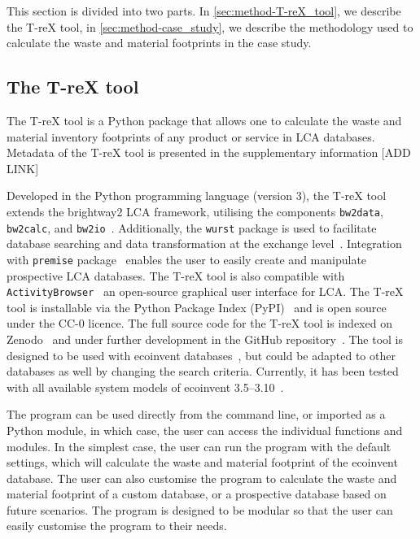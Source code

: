 This section is divided into two parts. In \autoref{sec:method-T-reX_tool}, we describe the T-reX tool, in \autoref{sec:method-case_study}, we describe the methodology used to calculate the waste and material footprints in the case study.

\subsection{The T-reX tool}
\label{sec:method-T-reX_tool}

The T-reX tool is a Python package that allows one to calculate the waste and material inventory footprints of any product or service in LCA databases. Metadata of the T-reX tool is presented in the supplementary information [ADD LINK]
    
Developed in the Python programming language (version 3), the T-reX tool extends the brightway2 LCA framework, utilising the components \texttt{bw2data}, \texttt{bw2calc}, and \texttt{bw2io}~\citep{mutel2017brightway}. Additionally, the \texttt{wurst} package is used to facilitate database searching and data transformation at the exchange level~\citep{mutel2017wurst}. Integration with \texttt{premise} package~\citep{sacchi2022premise} enables the user to easily create and manipulate prospective LCA databases. The T-reX tool is also compatible with \texttt{ActivityBrowser}~\citep{steubing2020activitybrowser} an open-source graphical user interface for LCA. The T-reX tool is installable via the Python Package Index (PyPI)~\citep{mcdowall2023T-reXpipy} and is open source under the CC-0 licence. The full source code for the T-reX tool is indexed on Zenodo~\citep{mcdowall2023T-reXzenodo} and under further development in the GitHub repository~\citep{mcdowall2024T-reXgithub}. The tool is designed to be used with ecoinvent databases~\citep{ecoinvent2016version3}, but could be adapted to other databases as well by changing the search criteria. Currently, it has been tested with all available system models of ecoinvent 3.5--3.10~\citep{ecoinvent2016version3}.

The program can be used directly from the command line, or imported as a Python module, in which case, the user can access the individual functions and modules. In the simplest case, the user can run the program with the default settings, which will calculate the waste and material footprint of the ecoinvent database. The user can also customise the program to calculate the waste and material footprint of a custom database, or a prospective database based on future scenarios. The program is designed to be modular so that the user can easily customise the program to their needs.

